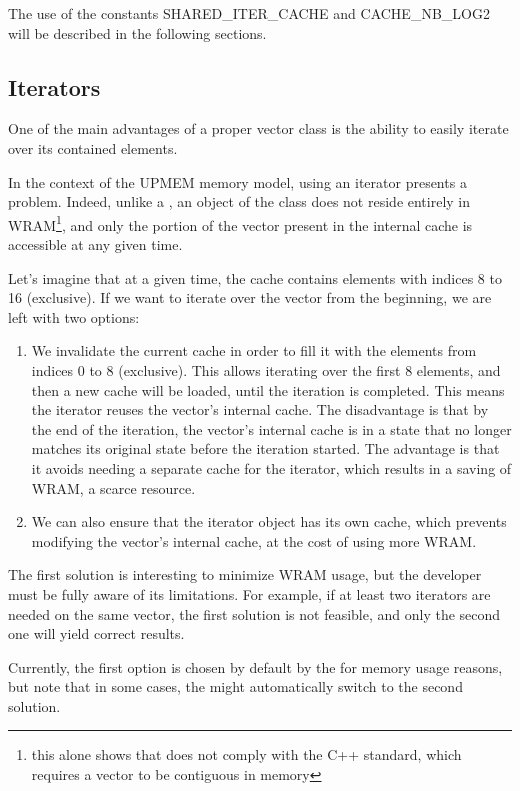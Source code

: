 The use of the constants SHARED\_ITER\_CACHE and CACHE\_NB\_LOG2 will be described in the following sections. 

\subsection{Iterators}
One of the main advantages of a proper vector class is the ability to easily iterate over its contained elements.

In the context of the UPMEM memory model, using an iterator presents a problem. 
Indeed, unlike a , an object of the  class does not reside entirely in 
WRAM\footnote{this alone shows that  does not comply with the C++ standard, which requires a vector to
 be contiguous in memory}, and only the portion of the vector present in the internal cache is accessible at any given time.

 Let’s imagine that at a given time, the cache contains elements with indices 8 to 16 (exclusive). 
 If we want to iterate over the vector from the beginning, we are left with two options:
 \begin{enumerate}
 \item We invalidate the current cache in order to fill it with the elements from indices 0 to 8 (exclusive). 
 This allows iterating over the first 8 elements, and then a new cache will be loaded, until the iteration is completed. 
 This means the iterator reuses the vector's internal cache. The disadvantage is that by the end of the iteration, 
 the vector’s internal cache is in a state that no longer matches its original state before the iteration started. 
 The advantage is that it avoids needing a separate cache for the iterator, which results in a saving of WRAM, a scarce resource.
 \item We can also ensure that the iterator object has its own cache, which prevents modifying the vector's internal cache, 
 at the cost of using more WRAM.
 \end{enumerate}

 The first solution is interesting to minimize WRAM usage, but the developer must be fully aware of its limitations. 
 For example, if at least two iterators are needed on the same vector, the first solution is not feasible, and only 
 the second one will yield correct results. 
 
 Currently, the first option is chosen by default by the \BPL for memory usage reasons, but
 note that in some cases, the \BPL might automatically switch to  the second solution.
 
